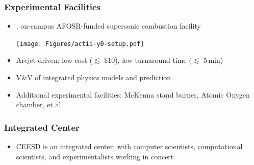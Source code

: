 \begin{frame}\frametitle{Experimental Facilities }


\vspace*{0.15in}
\begin{itemize}
\setlength{\itemsep}{0.in}
\item {}:  on-campus AFOSR-funded supersonic combustion facility


\texttt{[image: Figures/actii-y0-setup.pdf]}

\item Arcjet driven: low cost ($\lesssim$ \$10), low turnaround
  time ($\lesssim$ 5\,min)

\item V\&V of integrated physics models and prediction

\item Additional experimental facilities: McKenna stand burner, Atomic Oxygen chamber, et al

\end{itemize}

\end{frame}

\begin{frame}\frametitle{Integrated Center}

\begin{itemize}
\setlength{\itemsep}{0.22in}

\item CEESD is an integrated center, with computer
  scientists, computational scientists, and experimentalists working in concert

\end{itemize}

\begin{center}
\end{center}

\end{frame}

